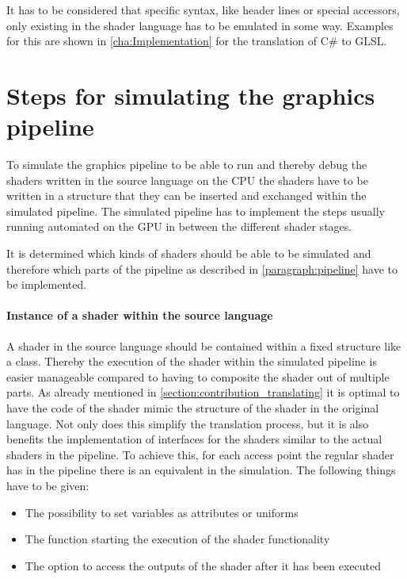 It has to be considered that specific syntax, like header lines or special accessors, only existing in the shader language has to be emulated in some way. Examples for this are shown in \autoref{cha:Implementation} for the translation of C\# to GLSL.

\section{Steps for simulating the graphics pipeline}
\label{section:contribution_simulating}

To simulate the graphics pipeline to be able to run and thereby debug the shaders written in the source language on the CPU the shaders have to be written in a structure that they can be inserted and exchanged within the simulated pipeline. The simulated pipeline has to implement the steps usually running automated on the GPU in between the different shader stages.

It is determined which kinds of shaders should be able to be simulated and therefore which parts of the pipeline as described in \autoref{paragraph:pipeline} have to be implemented.

\paragraph{Instance of a shader within the source language}

A shader in the source language should be contained within a fixed structure like a class. Thereby the execution of the shader within the simulated pipeline is easier manageable compared to having to composite the shader out of multiple parts.
As already mentioned in \autoref{section:contribution_translating} it is optimal to have the code of the shader mimic the structure of the shader in the original language. Not only does this simplify the translation process, but it is also benefits the implementation of interfaces for the shaders similar to the actual shaders in the pipeline. To achieve this, for each access point the regular shader has in the pipeline there is an equivalent in the simulation. The following things have to be given:
\begin{itemize}
\item The possibility to set variables as attributes or uniforms
\item The function starting the execution of the shader functionality
\item The option to access the outputs of the shader after it has been executed
\end{itemize}

